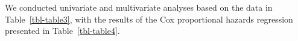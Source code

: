\documentclass[
  letterpaper,
  DIV=11,
  numbers=noendperiod]{scrartcl}
\begin{document}
We conducted univariate and multivariate analyses based on the data in
Table~\ref{tbl-table3}, with the results of the Cox proportional hazards
regression presented in Table~\ref{tbl-table4}.

\begin{table}

\caption{\label{tbl-table4}{Cox Proportional Hazards Regression Model
for Survival in Adult Women with IBC}}


\end{table}%
\end{document}
